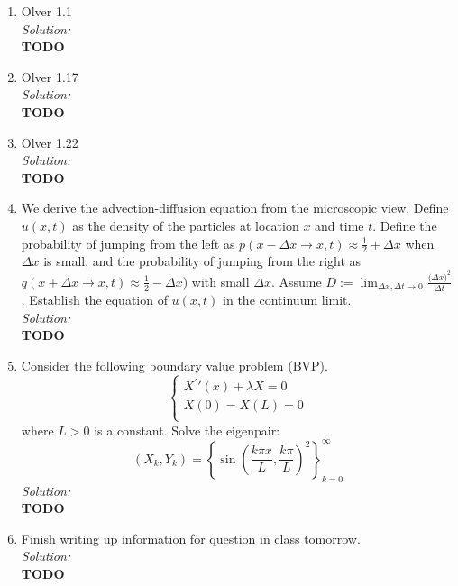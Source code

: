 \documentclass[10pt]{amsart}
\theoremstyle{nonumberplain}
\begin{document}
\begin{enumerate}[label={\bf {\arabic*}:}]
\item Olver 1.1 \\
\textit{Solution:} \\
\textbf{TODO} \\

\item Olver 1.17 \\
\textit{Solution:} \\
\textbf{TODO} \\

\item Olver 1.22 \\
\textit{Solution:} \\
\textbf{TODO} \\

\item We derive the advection-diffusion equation from the microscopic view.
Define $u(x, t)$ as the density of the particles at location $x$ and time $t$.
Define the probability of jumping from the left as $p(x - \Delta x \rightarrow x, t) \approx \frac 1 2 + \Delta x$
when $\Delta x$ is small, and the probability of jumping from the right as $q(x + \Delta x \rightarrow x, t) \approx \frac 1 2 - \Delta x $) with small $\Delta x$.
Assume $D := \lim_{\Delta x, \Delta t \rightarrow 0} \frac {\big(\Delta x\big)^2}{\Delta t}$.
Establish the equation of $u(x, t)$ in the continuum limit.
\\
\textit{Solution:} \\
\textbf{TODO} \\

\item Consider the following boundary value problem (BVP). \\
$$
\begin{cases}
X^\prime\prime(x) + \lambda X = 0 \\
X(0)  = X(L) = 0 \\
\end{cases}
$$
where $L > 0$ is a constant.
Solve the eigenpair:
$$
(X_k, Y_k) = \left\{ \sin \left( \frac {k \pi x}{L}, \frac {k \pi}{L} \right)^2 \right\}_{k=0}^\infty
$$
\textit{Solution:} \\
\textbf{TODO} \\

\item Finish writing up information for question in class tomorrow. \\
\textit{Solution:} \\
\textbf{TODO} \\

\end{enumerate}
\end{document}
